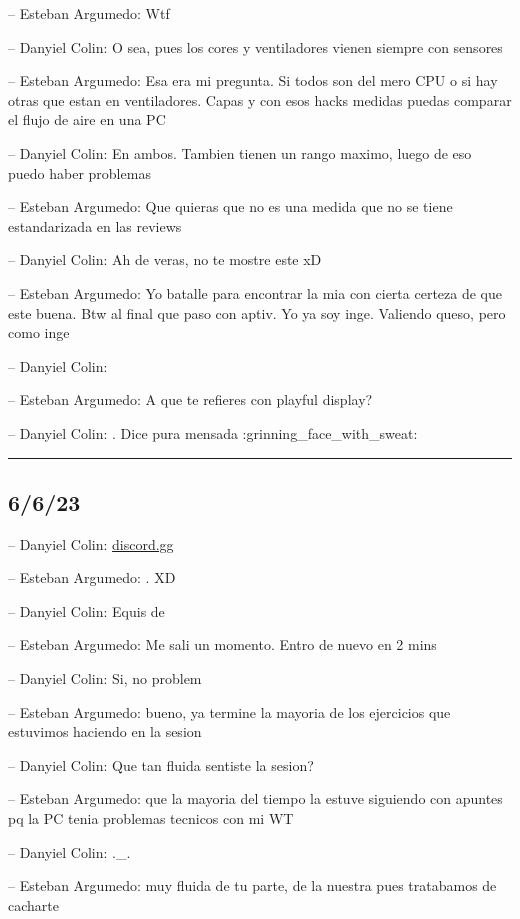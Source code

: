 -- Esteban Argumedo: Wtf

-- Danyiel Colin: O sea, pues los cores y ventiladores vienen siempre
con sensores

-- Esteban Argumedo: Esa era mi pregunta. Si todos son del mero CPU o si
hay otras que estan en ventiladores. Capas y con esos hacks medidas
puedas comparar el flujo de aire en una PC

-- Danyiel Colin: En ambos. Tambien tienen un rango maximo, luego de eso
puedo haber problemas

-- Esteban Argumedo: Que quieras que no es una medida que no se tiene
estandarizada en las reviews

-- Danyiel Colin: Ah de veras, no te mostre este xD

-- Esteban Argumedo: Yo batalle para encontrar la mia con cierta certeza
de que este buena. Btw al final que paso con aptiv. Yo ya soy inge.
Valiendo queso, pero como inge

-- Danyiel Colin:

-- Esteban Argumedo: A que te refieres con playful display?

-- Danyiel Colin: . Dice pura mensada :grinning\_face\_with\_sweat:

\begin{center}\rule{0.5\linewidth}{0.5pt}\end{center}

\hypertarget{section-210}{%
\subsection{6/6/23}\label{section-210}}

-- Danyiel Colin: \href{https://discord.gg/TsMAWRqR}{discord.gg}

-- Esteban Argumedo: . XD

-- Danyiel Colin: Equis de

-- Esteban Argumedo: Me sali un momento. Entro de nuevo en 2 mins

-- Danyiel Colin: Si, no problem

-- Esteban Argumedo: bueno, ya termine la mayoria de los ejercicios que
estuvimos haciendo en la sesion

-- Danyiel Colin: Que tan fluida sentiste la sesion?

-- Esteban Argumedo: que la mayoria del tiempo la estuve siguiendo con
apuntes pq la PC tenia problemas tecnicos con mi WT

-- Danyiel Colin: .\_.

-- Esteban Argumedo: muy fluida de tu parte, de la nuestra pues
tratabamos de cacharte

